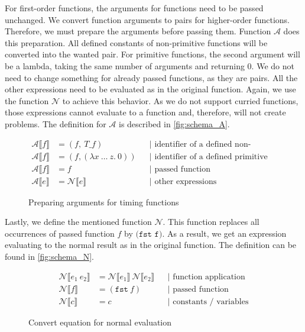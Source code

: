 For first-order functions, the arguments for functions need to be passed unchanged.
We convert function arguments to pairs for higher-order functions.
Therefore, we must prepare the arguments before passing them.
Function $\mathcal{A}$ does this preparation.
All defined constants of non-primitive functions will be converted into the wanted pair.
For primitive functions, the second argument will be a lambda, taking the same number of arguments and returning $0$.
We do not need to change something for already passed functions, as they are pairs.
All the other expressions need to be evaluated as in the original function.
Again, we use the function $\mathcal{N}$ to achieve this behavior.
As we do not support curried functions, those expressions cannot evaluate to a function and, therefore, will not create problems.
The definition for $\mathcal{A}$ is described in \autoref{fig:schema_A}.
\begin{figure}
  \begin{align*}
    \mathcal{A}\llbracket f\rrbracket &= (f,\ T\_f) &&\text{| identifier of a defined non-primitive function}\\
    \mathcal{A}\llbracket f\rrbracket &= (f, (\lambda x\ \dots\ z.\ 0)) &&\text{| identifier of a defined primitive function}\\
    \mathcal{A}\llbracket f\rrbracket &= f &&\text{| passed function}\\
    \mathcal{A}\llbracket e\rrbracket &= \mathcal{N}\llbracket e\rrbracket &&\text{| other expressions}
  \end{align*}
  \caption{Preparing arguments for timing functions}
  \label{fig:schema_A}
\end{figure}

Lastly, we define the mentioned function $\mathcal{N}$.
This function replaces all occurrences of passed function $f$ by $\texttt{(fst f)}$.
As a result, we get an expression evaluating to the normal result as in the original function.
The definition can be found in \autoref{fig:schema_N}.
\begin{figure}
\begin{align*}
  \mathcal{N}\llbracket e_{1}\ e_{2}\rrbracket &= \mathcal{N}\llbracket e_{1}\rrbracket\ \mathcal{N}\llbracket e_{2}\rrbracket &&\text{| function application}\\
  \mathcal{N}\llbracket f\rrbracket &= (\texttt{fst}\ f) &&\text{| passed function}\\
  \mathcal{N}\llbracket c\rrbracket &= c &&\text{| constants / variables}
\end{align*}
\caption{Convert equation for normal evaluation}
\label{fig:schema_N}
\end{figure}

